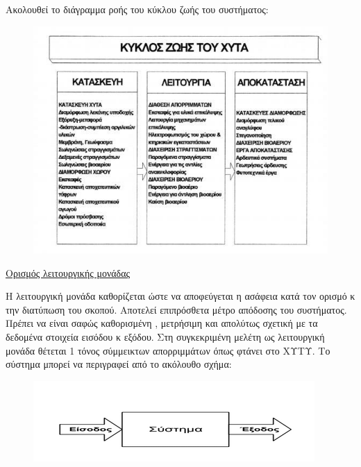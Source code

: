 \documentclass[12pt]{article}
\begin{document}
 	Ακολουθεί το διάγραμμα ροής του κύκλου ζωής του συστήματος:
 	
 	\begin{figure} [H]
 		\begin{center}
 			\includegraphics [scale = 0.70] {diagram7.png}
 		\end{center}
 	\end{figure}
 
 	\underline{Ορισμός λειτουργικής μονάδας}
 	
 	Η λειτουργική μονάδα καθορίζεται ώστε να αποφεύγεται η ασάφεια κατά τον ορισμό κ την διατύπωση του σκοπού. Αποτελεί επιπρόσθετα μέτρο απόδοσης του συστήματος. Πρέπει να είναι σαφώς καθορισμένη , μετρήσιμη και απολύτως σχετική με τα δεδομένα στοιχεία εισόδου κ εξόδου. Στη συγκεκριμένη μελέτη ως λειτουργική μονάδα θέτεται 1 τόνος σύμμεικτων απορριμμάτων όπως φτάνει στο ΧΥΤΥ. Το σύστημα μπορεί να περιγραφεί από το ακόλουθο σχήμα:
 	
 	\begin{figure} [H]
 		\begin{center}
 			\includegraphics [scale = 0.80] {diagram8.png}
 		\end{center}
 	\end{figure}
 
\end{document}
